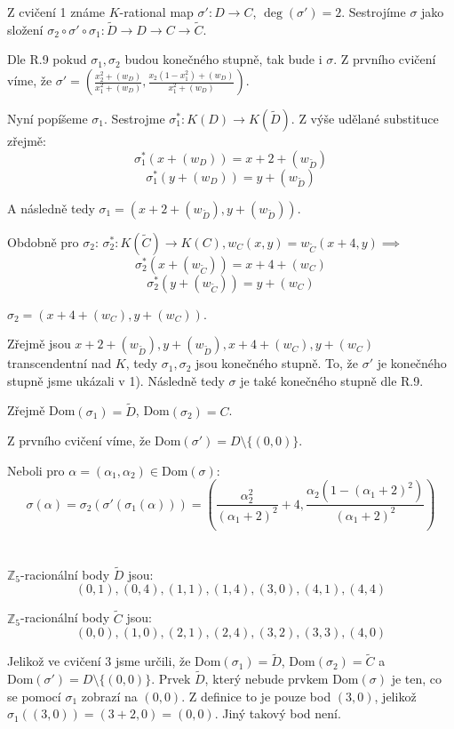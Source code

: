 \documentclass[12pt, a4paper]{article}
\begin{document}
Z cvičení 1 známe $K$-rational map $\sigma': D \rightarrow C$, $\deg(\sigma')=2$. Sestrojíme $\sigma$ jako složení $\sigma_2 \circ \sigma' \circ \sigma_1: \tilde{D} \rightarrow D \rightarrow C \rightarrow \tilde{C}$.

Dle R.9 pokud $\sigma_1, \sigma_2$ budou konečného stupně, tak bude i $\sigma$. Z prvního cvičení víme, že $\sigma'=\left(\frac{x_2^2+(w_D)}{x_1^2+(w_D)}, \frac{x_2(1-x_1^2)+(w_D)}{x_1^2+(w_D)}\right)$.

Nyní popíšeme $\sigma_1$. Sestrojme $\sigma_1^*: K(D) \rightarrow K(\tilde{D})$. Z výše udělané substituce zřejmě: 
\[\sigma_1^*(x+(w_D)) = x+2+(w_{\tilde{D}})\]
\[\sigma_1^*(y+(w_D)) = y+(w_{\tilde{D}})\]

A následně tedy $\sigma_1 = (x+2+(w_{\tilde{D}}),y+(w_{\tilde{D}}))$. 

Obdobně pro $\sigma_2$: $\sigma_2^*: K(\tilde{C}) \rightarrow K(C), w_C(x,y)=w_{\tilde{C}}(x+4,y) \implies$
\[\sigma_2^*(x+(w_{\tilde{C}}))=x+4+(w_C)\]
\[\sigma_2^*(y+(w_{\tilde{C}}))=y+(w_C)\]

$\sigma_2=(x+4+(w_C), y+(w_C))$.

Zřejmě jsou $x+2+(w_{\tilde{D}}), y+(w_{\tilde{D}}), x+4+(w_C), y+(w_C)$ transcendentní nad $K$, tedy $\sigma_1,\sigma_2$ jsou konečného stupně. To, že $\sigma'$ je konečného stupně jsme ukázali v 1). Následně tedy $\sigma$ je také konečného stupně dle R.9.

Zřejmě Dom$(\sigma_1) = \tilde{D}$, Dom$(\sigma_2)=C$. 

Z prvního cvičení víme, že Dom$(\sigma')=D\setminus \{(0,0)\}$.

Neboli pro $\alpha=(\alpha_1,\alpha_2) \in \text{Dom}(\sigma)$:\\
\[\sigma(\alpha)=\sigma_2(\sigma'(\sigma_1(\alpha)))=\left(\frac{\alpha_2^2}{(\alpha_1+2)^2}+4,\frac{\alpha_2(1-(\alpha_1+2)^2)}{(\alpha_1+2)^2}\right)\]

\section{}
$\mathbb{Z}_5$-racionální body $\tilde{D}$ jsou:
\[(0,1),(0,4),(1,1),(1,4),(3,0),(4,1),(4,4)\]

$\mathbb{Z}_5$-racionální body $\tilde{C}$ jsou:
\[(0,0),(1,0),(2,1),(2,4),(3,2),(3,3),(4,0)\]

Jelikož ve cvičení 3 jsme určili, že Dom$(\sigma_1) = \tilde{D}$, Dom$(\sigma_2) = \tilde{C}$ a \\
Dom$(\sigma') = D \setminus \{(0,0)\}$. Prvek $\tilde{D}$, který nebude prvkem Dom$(\sigma)$ je ten, co se pomocí $\sigma_1$ zobrazí na $(0,0)$. Z definice to je pouze bod $(3,0)$, jelikož $\sigma_1((3,0)) = (3+2,0) = (0,0)$. Jiný takový bod není.
\end{document}
